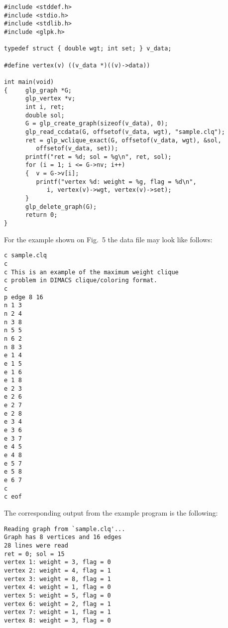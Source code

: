 \documentclass[11pt]{report}
\begin{document}
\newpage

\begin{footnotesize}
\begin{verbatim}
#include <stddef.h>
#include <stdio.h>
#include <stdlib.h>
#include <glpk.h>

typedef struct { double wgt; int set; } v_data;

#define vertex(v) ((v_data *)((v)->data))

int main(void)
{     glp_graph *G;
      glp_vertex *v;
      int i, ret;
      double sol;
      G = glp_create_graph(sizeof(v_data), 0);
      glp_read_ccdata(G, offsetof(v_data, wgt), "sample.clq");
      ret = glp_wclique_exact(G, offsetof(v_data, wgt), &sol,
         offsetof(v_data, set));
      printf("ret = %d; sol = %g\n", ret, sol);
      for (i = 1; i <= G->nv; i++)
      {  v = G->v[i];
         printf("vertex %d: weight = %g, flag = %d\n",
            i, vertex(v)->wgt, vertex(v)->set);
      }
      glp_delete_graph(G);
      return 0;
}
\end{verbatim}
\end{footnotesize}

For the example shown on Fig.~5 the data file may look like follows:

\begin{footnotesize}
\begin{verbatim}
c sample.clq
c
c This is an example of the maximum weight clique
c problem in DIMACS clique/coloring format.
c
p edge 8 16
n 1 3
n 2 4
n 3 8
n 5 5
n 6 2
n 8 3
e 1 4
e 1 5
e 1 6
e 1 8
e 2 3
e 2 6
e 2 7
e 2 8
e 3 4
e 3 6
e 3 7
e 4 5
e 4 8
e 5 7
e 5 8
e 6 7
c
c eof
\end{verbatim}
\end{footnotesize}

The corresponding output from the example program is the following:

\begin{footnotesize}
\begin{verbatim}
Reading graph from `sample.clq'...
Graph has 8 vertices and 16 edges
28 lines were read
ret = 0; sol = 15
vertex 1: weight = 3, flag = 0
vertex 2: weight = 4, flag = 1
vertex 3: weight = 8, flag = 1
vertex 4: weight = 1, flag = 0
vertex 5: weight = 5, flag = 0
vertex 6: weight = 2, flag = 1
vertex 7: weight = 1, flag = 1
vertex 8: weight = 3, flag = 0
\end{verbatim}
\end{footnotesize}
\end{document}
